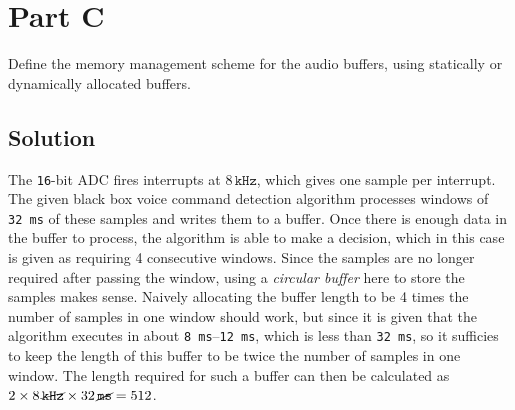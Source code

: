 \section*{Part C}

Define the memory management scheme for the audio buffers, using statically or dynamically allocated buffers.

\subsection*{Solution}

The \texttt{16}-bit ADC fires interrupts at \( 8\,\texttt{kHz} \), which gives one sample per interrupt.
The given black box voice command detection algorithm processes windows of \texttt{32\,ms} of these samples and writes them to a buffer.
Once there is enough data in the buffer to process, the algorithm is able to make a decision, which in this case is given as requiring 4 consecutive windows.
Since the samples are no longer required after passing the window, using a \textit{circular buffer} here to store the samples makes sense.
Naively allocating the buffer length to be 4 times the number of samples in one window should work, but since it is given that the algorithm executes in about \texttt{8\,ms}--\texttt{12\,ms}, which is less than \texttt{32\,ms}, so it sufficies to keep the length of this buffer to be twice the number of samples in one window.
The length required for such a buffer can then be calculated as \( 2 \times 8\,\cancel{\texttt{kHz}} \times 32\,\cancel{\texttt{ms}} = 512 \).
